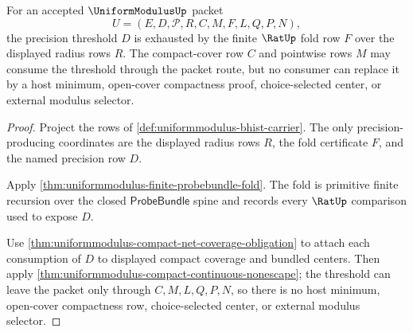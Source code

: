 \begin{theorem}
\label{thm:uniformmodulus-root-fold-threshold-exhaustion}
For an accepted $\UniformModulusUp$ packet
$$
U=(E,D,\mathcal{P},R,C,M,F,L,Q,P,N),
$$
the precision threshold $D$ is exhausted by the finite $\RatUp$ fold row $F$ over the displayed radius rows $R$. The compact-cover row $C$ and pointwise rows $M$ may consume the threshold through the packet route, but no consumer can replace it by a host minimum, open-cover compactness proof, choice-selected center, or external modulus selector.
\end{theorem}
\begin{proof}
Project the rows of \autoref{def:uniformmodulus-bhist-carrier}. The only precision-producing coordinates are the displayed radius rows $R$, the fold certificate $F$, and the named precision row $D$.

Apply \autoref{thm:uniformmodulus-finite-probebundle-fold}. The fold is primitive finite recursion over the closed $\mathsf{ProbeBundle}$ spine and records every $\RatUp$ comparison used to expose $D$.

Use \autoref{thm:uniformmodulus-compact-net-coverage-obligation} to attach each consumption of $D$ to displayed compact coverage and bundled centers. Then apply \autoref{thm:uniformmodulus-compact-continuous-nonescape}; the threshold can leave the packet only through $C,M,L,Q,P,N$, so there is no host minimum, open-cover compactness row, choice-selected center, or external modulus selector.
\end{proof}

